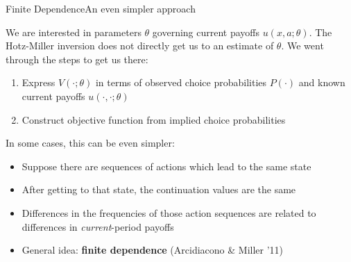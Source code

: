\documentclass[11pt,aspectratio=169]{beamer}
\begin{document}


\begin{frame}{Finite Dependence}{An even simpler approach}


We are interested in parameters $\theta$ governing current payoffs $ u(x,a;\theta)$. The Hotz-Miller inversion does not directly get us to an estimate of $\theta$. We went through the steps to get us there:
  \begin{enumerate} \itemsep1ex

    \item Express $V(\cdot;\theta)$ in terms of observed choice probabilities $P(\cdot)$ and known current payoffs $u(\cdot,\cdot ; \theta)$
    \item Construct objective function from implied choice probabilities
  \end{enumerate}
  
In some cases, this can be even simpler:
  \begin{itemize} \itemsep1ex

    \item Suppose there are sequences of actions which lead to the same state
    \item After getting to that state, the continuation values are the same
    \item Differences in the frequencies of those action sequences are related to differences in \emph{current}-period payoffs
    \item General idea: \textbf{finite dependence} (Arcidiacono \& Miller '11)
  \end{itemize}

\end{frame}
\end{document}
